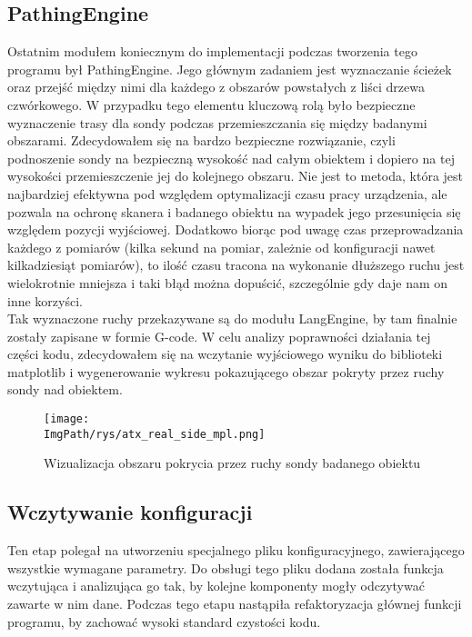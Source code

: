 \documentclass[a4paper,12pt,twoside,openany]{report}
\newcommand{\ImgPath}{.}
\begin{document}
    \subsection{PathingEngine}
      Ostatnim modułem koniecznym do implementacji podczas tworzenia tego programu był PathingEngine. Jego głównym zadaniem jest wyznaczanie ścieżek oraz 
      przejść między nimi dla każdego z obszarów powstałych z liści drzewa czwórkowego. W przypadku tego elementu kluczową rolą było bezpieczne wyznaczenie 
      trasy dla sondy podczas przemieszczania się między badanymi obszarami. Zdecydowałem się na bardzo bezpieczne rozwiązanie, czyli podnoszenie sondy na 
      bezpieczną wysokość nad całym obiektem i dopiero na tej wysokości przemieszczenie jej do kolejnego obszaru. Nie jest to metoda, która jest najbardziej 
      efektywna pod względem optymalizacji czasu pracy urządzenia, ale pozwala na ochronę skanera i badanego obiektu na wypadek jego przesunięcia się względem 
      pozycji wyjściowej. Dodatkowo biorąc pod uwagę czas przeprowadzania każdego z pomiarów (kilka sekund na pomiar, zależnie od konfiguracji nawet kilkadziesiąt 
      pomiarów), to ilość czasu tracona na wykonanie dłuższego ruchu jest wielokrotnie mniejsza i taki błąd można dopuścić, szczególnie gdy daje nam on inne korzyści.\\
      Tak wyznaczone ruchy przekazywane są do modułu LangEngine, by tam finalnie zostały zapisane w formie G-code. W celu analizy poprawności działania tej części 
      kodu, zdecydowałem się na wczytanie wyjściowego wyniku do biblioteki matplotlib i wygenerowanie wykresu pokazującego obszar pokryty przez ruchy sondy nad obiektem.
      \noindent
      \begin{figure}[!htbp]
        \begin{center}
      \centering
      \texttt{[image: \\ImgPath/rys/atx\_real\_side\_mpl.png]}
      \end{center}
        \caption{Wizualizacja obszaru pokrycia przez ruchy sondy badanego obiektu}
        \label{ATXrmap}
      \end{figure}
      \clearpage

    \subsection{Wczytywanie konfiguracji}
      Ten etap polegał na utworzeniu specjalnego pliku konfiguracyjnego, zawierającego wszystkie wymagane parametry. Do obsługi tego pliku dodana została funkcja 
      wczytująca i analizująca go tak, by kolejne komponenty mogły odczytywać zawarte w nim dane. Podczas tego etapu nastąpiła refaktoryzacja głównej funkcji 
      programu, by zachować wysoki standard czystości kodu.
\end{document}
